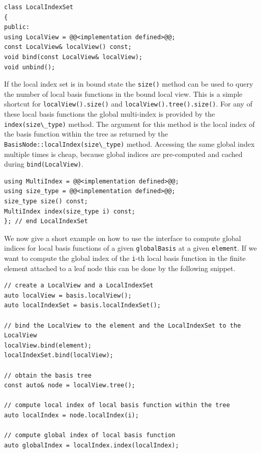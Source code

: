 \documentclass[a4paper,10pt,headings=normal,bibliography=totoc]{scrartcl}
\newcommand{\cpp}[1]{\lstinline[basicstyle=\ttfamily]!#1!}
\begin{document}
\begin{lstlisting}[style=Interface]
class LocalIndexSet
{
public:
using LocalView = @@<implementation defined>@@;
const LocalView& localView() const;
void bind(const LocalView& localView);
void unbind();
\end{lstlisting}

If the local index set is in bound state
the \cpp{size()} method can be used to query
the number of local basis functions in the
bound local view. This is a simple shortcut for
\cpp{localView().size()} and \cpp{localView().tree().size()}.
For any of these local basis functions the global
multi-index is provided by the \cpp{index(size\_type)}
method. The argument for this method is the local
index of the basis function within the tree as
returned by the \cpp{BasisNode::localIndex(size\_type)}
method.
Accessing the same global index multiple times
is cheap, because global indices are pre-computed
and cached during \cpp{bind(LocalView)}.

\begin{lstlisting}[style=Interface]
using MultiIndex = @@<implementation defined>@@;
using size_type = @@<implementation defined>@@;
size_type size() const;
MultiIndex index(size_type i) const;
}; // end LocalIndexSet
\end{lstlisting}

We now give a short example on how to use the interface
to compute global indices for local basis functions
of a given \cpp{globalBasis} at a given \cpp{element}.
If we want to compute the global index of the \cpp{i}-th
local basis function in the finite element attached to
a leaf node this can be done by the following snippet.

\begin{lstlisting}[style=Example]
// create a LocalView and a LocalIndexSet
auto localView = basis.localView();
auto localIndexSet = basis.localIndexSet();

// bind the LocalView to the element and the LocalIndexSet to the LocalView
localView.bind(element);
localIndexSet.bind(localView);

// obtain the basis tree
const auto& node = localView.tree();

// compute local index of local basis function within the tree
auto localIndex = node.localIndex(i);

// compute global index of local basis function
auto globalIndex = localIndex.index(localIndex);
\end{lstlisting}
\end{document}
